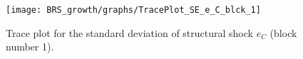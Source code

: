 \begin{figure}[H]
\centering
  \texttt{[image: BRS\_growth/graphs/TracePlot\_SE\_e\_C\_blck\_1]}\\
    \caption{Trace plot for the standard deviation of structural shock ${e_C}$ (block number 1).}
\end{figure}
